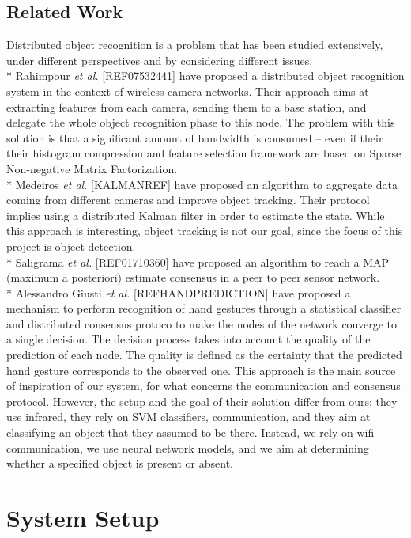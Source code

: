 \documentclass[10pt,conference,compsocconf]{IEEEtran}
\begin{document}
\subsection{Related Work}
Distributed object recognition is a problem that has been studied extensively, under different perspectives and by considering different issues.\\*
Rahimpour \textit{et al.} [REF07532441] have proposed a distributed object recognition system in the context of wireless camera networks. Their approach aims at extracting features from each camera, sending them to a base station, and delegate the whole object recognition phase to this node. The problem with this solution is that a significant amount of bandwidth is consumed -- even if their their histogram compression and feature selection framework are based on Sparse Non-negative Matrix Factorization.\\*
Medeiros \textit{et al.} [KALMANREF] have proposed an algorithm to aggregate data coming from different cameras and improve object tracking. Their protocol implies using a distributed Kalman filter in order to estimate the state. While this approach is interesting, object tracking is not our goal, since the focus of this project is object detection.\\*
Saligrama \textit{et al.} [REF01710360] have proposed an algorithm to reach a MAP (maximum a posteriori) estimate consensus in a peer to peer sensor network.\\*
Alessandro Giusti \textit{et al.} [REFHANDPREDICTION] have proposed a mechanism to perform recognition of hand gestures through a statistical classifier and distributed consensus protoco to make the nodes of the network converge to a single decision. The decision process takes into account the quality of the prediction of each node. The quality is defined as the certainty that the predicted hand gesture corresponds to the observed one. This approach is the main source of inspiration of our system, for what concerns the communication and consensus protocol. However, the setup and the goal of their solution differ from ours: they use infrared, they rely on SVM classifiers, communication, and they aim at classifying an object that they assumed to be there. Instead, we rely on wifi communication, we use neural network models, and we aim at determining whether a specified object is present or absent.
\section{System Setup}
\end{document}
